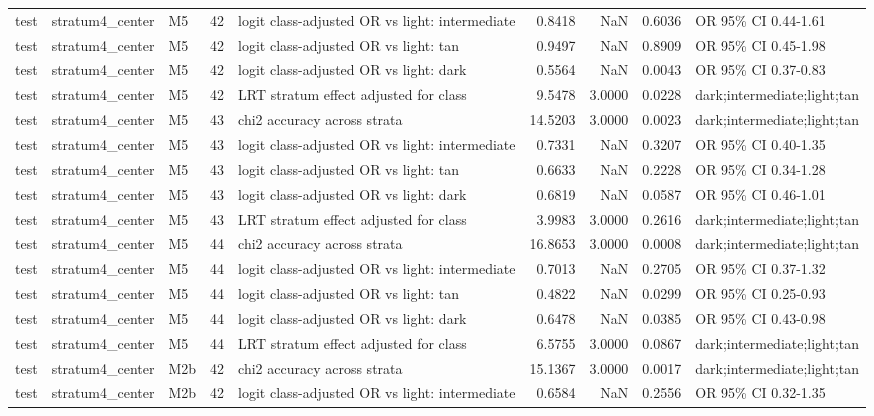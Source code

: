 \begin{tabular}{lllrlrrrl}
test & stratum4\_center & M5 & 42 & logit class-adjusted OR vs light: intermediate & 0.8418 & NaN & 0.6036 & OR 95\% CI 0.44-1.61 \\
test & stratum4\_center & M5 & 42 & logit class-adjusted OR vs light: tan & 0.9497 & NaN & 0.8909 & OR 95\% CI 0.45-1.98 \\
test & stratum4\_center & M5 & 42 & logit class-adjusted OR vs light: dark & 0.5564 & NaN & 0.0043 & OR 95\% CI 0.37-0.83 \\
test & stratum4\_center & M5 & 42 & LRT stratum effect adjusted for class & 9.5478 & 3.0000 & 0.0228 & dark;intermediate;light;tan \\
test & stratum4\_center & M5 & 43 & chi2 accuracy across strata & 14.5203 & 3.0000 & 0.0023 & dark;intermediate;light;tan \\
test & stratum4\_center & M5 & 43 & logit class-adjusted OR vs light: intermediate & 0.7331 & NaN & 0.3207 & OR 95\% CI 0.40-1.35 \\
test & stratum4\_center & M5 & 43 & logit class-adjusted OR vs light: tan & 0.6633 & NaN & 0.2228 & OR 95\% CI 0.34-1.28 \\
test & stratum4\_center & M5 & 43 & logit class-adjusted OR vs light: dark & 0.6819 & NaN & 0.0587 & OR 95\% CI 0.46-1.01 \\
test & stratum4\_center & M5 & 43 & LRT stratum effect adjusted for class & 3.9983 & 3.0000 & 0.2616 & dark;intermediate;light;tan \\
test & stratum4\_center & M5 & 44 & chi2 accuracy across strata & 16.8653 & 3.0000 & 0.0008 & dark;intermediate;light;tan \\
test & stratum4\_center & M5 & 44 & logit class-adjusted OR vs light: intermediate & 0.7013 & NaN & 0.2705 & OR 95\% CI 0.37-1.32 \\
test & stratum4\_center & M5 & 44 & logit class-adjusted OR vs light: tan & 0.4822 & NaN & 0.0299 & OR 95\% CI 0.25-0.93 \\
test & stratum4\_center & M5 & 44 & logit class-adjusted OR vs light: dark & 0.6478 & NaN & 0.0385 & OR 95\% CI 0.43-0.98 \\
test & stratum4\_center & M5 & 44 & LRT stratum effect adjusted for class & 6.5755 & 3.0000 & 0.0867 & dark;intermediate;light;tan \\
test & stratum4\_center & M2b & 42 & chi2 accuracy across strata & 15.1367 & 3.0000 & 0.0017 & dark;intermediate;light;tan \\
test & stratum4\_center & M2b & 42 & logit class-adjusted OR vs light: intermediate & 0.6584 & NaN & 0.2556 & OR 95\% CI 0.32-1.35 \\

\end{tabular}
